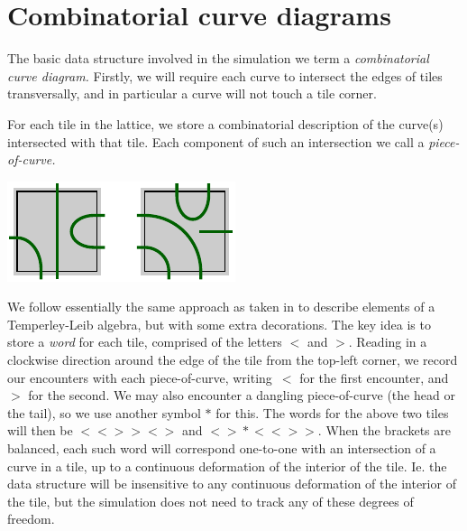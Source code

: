 \documentclass[aps, prl, letterpaper, twocolumn, superscriptaddress, notitlepage, 10pt]{revtex4-1}
\begin{document}

%
%

%
%

%
%

%
%

\section{Combinatorial curve diagrams}

The basic data structure involved in the
simulation we term a \emph{combinatorial curve diagram.}
Firstly, we will require each curve to intersect 
the edges of tiles transversally,
and in particular a curve will not touch a tile corner.

For each tile in the lattice,
we store a combinatorial
description of the curve(s) intersected with that tile.
Each component of such an intersection we call a \emph{piece-of-curve.}
\begin{center}
\includegraphics[]{pic-cells.pdf}
\end{center}

We follow essentially the same approach as taken in \cite{Abramsky2007} 
to describe elements of a Temperley-Leib algebra, but
with some extra decorations.
The key idea is to store a \emph{word} for each tile, comprised of
the letters $\bigl<$ and $\bigr>$.
Reading in a clockwise direction around the edge of
the tile from the top-left corner,
we record our encounters with each piece-of-curve,
writing~$\bigl<$ for the first encounter, and~$\bigr>$ for the
second.
We may also encounter a dangling piece-of-curve
(the head or the tail), so we use another symbol $*$ for this.
The words for the above two tiles will then be 
$\bigl<\bigl<\bigr>\bigr>\bigl<\bigr>$ and $\bigl<\bigr>*\bigl<\bigl<\bigr>\bigr>.$
When the brackets are balanced,
each such word will correspond one-to-one with an intersection
of a curve in a tile, up to a continuous deformation of the interior of the tile.
Ie. the data structure 
will be insensitive to any continuous deformation of the interior of the tile,
but the simulation does not need to track any of these degrees of freedom.
\end{document}
